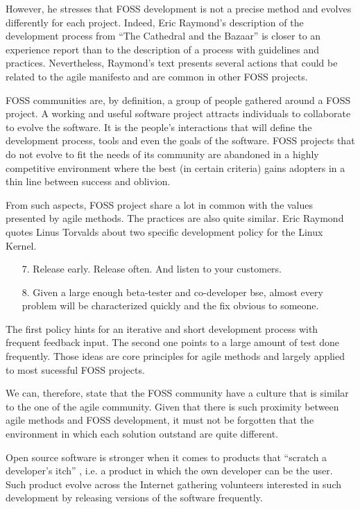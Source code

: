 \documentclass[lnbip]{svmultln}
\begin{document}
However, he stresses that FOSS development is not a precise method and
evolves differently for each project. Indeed, Eric Raymond's
description of the development process from ``The Cathedral and the
Bazaar'' \cite{raymond1999} is closer to an experience report than to
the description of a process with guidelines and
practices. Nevertheless, Raymond's text presents several actions that
could be related to the agile manifesto \cite{url:agilemanifesto} and
are common in other FOSS projects.

FOSS communities are, by definition, a group of people gathered around
a FOSS project. A working and useful software project attracts
individuals to collaborate to evolve the
software\cite{crowston2002}. It is the people's interactions that will
define the development process, tools and even the goals of the
software. FOSS projects that do not evolve to fit the needs of its
community are abandoned in a highly competitive environment where the
best (in certain criteria) gains adopters in a thin line between
success and oblivion.

From such aspects, FOSS project share a lot in common with the values
presented by agile methods. The practices are also quite similar. Eric
Raymond quotes Linus Torvalds about two specific development policy
for the Linux Kernel.
\begin{enumerate}
\item[7.] Release early. Release often. And listen to your customers.
\item[8.] Given a large enough beta-tester and co-developer bse,
  almost every problem will be characterized quickly and the fix
  obvious to someone.
\end{enumerate}

The first policy hints for an iterative and short development process
with frequent feedback input. The second one points to a large amount
of test done frequently. Those ideas are core principles for agile
methods and largely applied to most sucessful FOSS projects.

We can, therefore, state that the FOSS community have a culture that
is similar to the one of the agile community. Given that there is such
proximity between agile methods and FOSS development, it must not be
forgotten that the environment in which each solution outstand are
quite different.

Open source software is stronger when it comes to products that
``scratch a developer's itch'' \cite{fitzgeral2000}, i.e. a product in
which the own developer can be the user. Such product evolve across
the Internet gathering volunteers interested in such development by
releasing versions of the software frequently.
\end{document}
